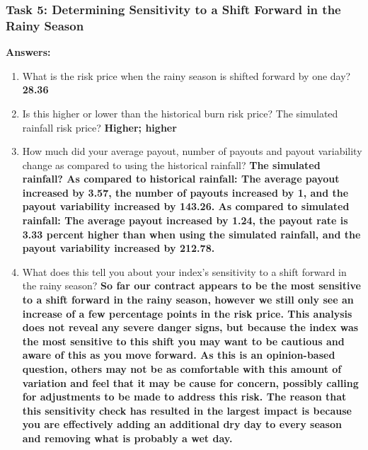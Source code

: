 \documentclass[letterpaper,10pt,english]{sphinxmanual}
\begin{document}
\subsubsection{Task 5: Determining Sensitivity to a Shift Forward in the Rainy Season}
\label{wiiet/wiiet_initialtomarketpricinganskey:task-5-determining-sensitivity-to-a-shift-forward-in-the-rainy-season}
\textbf{Answers:}
\begin{enumerate}
\item {} 
What is the risk price when the rainy season is shifted forward by one day? \textbf{28.36}

\item {} 
Is this higher or lower than the historical burn risk price? The simulated rainfall risk price? \textbf{Higher; higher}

\item {} 
How much did your average payout, number of payouts and payout variability change as compared to using the historical rainfall? \textbf{The simulated rainfall? As compared to historical rainfall: The average payout increased by 3.57, the number of payouts increased by 1, and the payout variability increased by 143.26.  As compared to simulated rainfall: The average payout increased by 1.24, the payout rate is 3.33 percent higher than when using the simulated rainfall, and the payout variability increased by 212.78.}

\item {} 
What does this tell you about your index's sensitivity to a shift forward in the rainy season? \textbf{So far our contract appears to be the most sensitive to a shift forward in the rainy season, however we still only see an increase of a few percentage points in the risk price. This analysis does not reveal any severe danger signs, but because the index was the most sensitive to this shift you may want to be cautious and aware of this as you move forward. As this is an opinion-based question, others may not be as comfortable with this amount of variation and feel that it may be cause for concern, possibly calling for adjustments to be made to address this risk. The reason that this sensitivity check has resulted in the largest impact is because you are effectively adding an additional dry day to every season and removing what is probably a wet day.}

\end{enumerate}
\end{document}
